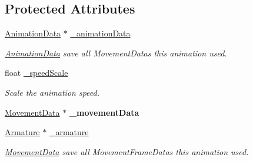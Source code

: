 \subsection*{Protected Attributes}
\begin{DoxyCompactItemize}
\item 
\mbox{\label{classcocostudio_1_1ArmatureAnimation_a5d92d0c90080c26ad05921d0ab11044e}} 
\hyperlink{classcocostudio_1_1AnimationData}{Animation\+Data} $\ast$ \hyperlink{classcocostudio_1_1ArmatureAnimation_a5d92d0c90080c26ad05921d0ab11044e}{\+\_\+animation\+Data}
\begin{DoxyCompactList}\small\item\em \hyperlink{classcocostudio_1_1AnimationData}{Animation\+Data} save all Movement\+Datas this animation used. \end{DoxyCompactList}\item 
\mbox{\label{classcocostudio_1_1ArmatureAnimation_aa4e0fd21031b080f44fb27bdcc84d472}} 
float \hyperlink{classcocostudio_1_1ArmatureAnimation_aa4e0fd21031b080f44fb27bdcc84d472}{\+\_\+speed\+Scale}
\begin{DoxyCompactList}\small\item\em Scale the animation speed. \end{DoxyCompactList}\item 
\mbox{\label{classcocostudio_1_1ArmatureAnimation_a9458f0126459378b85e3a303510a5665}} 
\hyperlink{classcocostudio_1_1MovementData}{Movement\+Data} $\ast$ {\bfseries \+\_\+movement\+Data}
\item 
\mbox{\label{classcocostudio_1_1ArmatureAnimation_a0529f0c732691ecaedf0498a2a4ce3d0}} 
\hyperlink{classcocostudio_1_1Armature}{Armature} $\ast$ \hyperlink{classcocostudio_1_1ArmatureAnimation_a0529f0c732691ecaedf0498a2a4ce3d0}{\+\_\+armature}
\begin{DoxyCompactList}\small\item\em \hyperlink{classcocostudio_1_1MovementData}{Movement\+Data} save all Movement\+Frame\+Datas this animation used. \end{DoxyCompactList}\item 
\mbox{\label{classcocostudio_1_1ArmatureAnimation_a378e821226ac15429c6855e91f7cba7d}} 

\end{DoxyCompactItemize}
